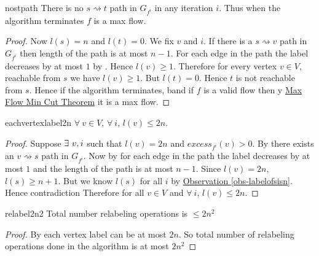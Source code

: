 \begin{corolary}{}{nostpath}
	There is no $s\rightsquigarrow t$ path in $G_{f^i}$ in any iteration $i$. Thus when the algorithm terminates $f$ is a max flow.
\end{corolary}
\begin{proof}
	Now $l(s)=n$ and $l(t)=0$. We fix $v$ and $i$. If there is a $s\rightsquigarrow v$ path in $G_{f^i}$ then length of the path is at most $n-1$. For each edge in the path the label decreases by at most $1$ by . Hence $l(v)\geq 1$. Therefore for every vertex $v\in V$, reachable from $s$ we have $l(v)\geq 1$. But $l(t)=0$. Hence $t$ is not reachable from $s$. 	Hence if the algorithm terminates, band if $f$ is a valid flow then y \hyperref[th:maxflowmincut]{Max Flow Min Cut Theorem}  it is a max flow.
\end{proof}
\begin{corolary}{}{eachvertexlabel2n}
	$\forall\ v\in V$, $\forall\ i$, $l(v)\leq 2n$.
\end{corolary}
\begin{proof}
	Suppose $\exists\ v,i$ such that $l(v)=2n$ and $\textit{excess}_{f^i}(v)>0$. By  there exists an $v\rightsquigarrow s$ path in $G_{f^i}$. Now by  for each edge in the path the label decreases by at most $1$ and the length of the path is at most $n-1$. Since $l(v)=2n$, $l(s)\geq n+1$. But we know $l(s)$ for all $i$ by \hyperref[obs-labelofsisn]{Observation \ref{obs-labelofsisn}}. Hence contradiction \ctr Therefore for all $v\in V$ and $\forall\ i$, $l(v)\leq 2n$.
\end{proof}

\begin{corolary}{}{relabel2n2}
	Total number relabeling operations is $\leq 2n^2$
\end{corolary}
\begin{proof}
	By  each vertex label can be at most $2n$. So total number of relabeling operations done in the algorithm is at most $2n^2$
\end{proof}
 
